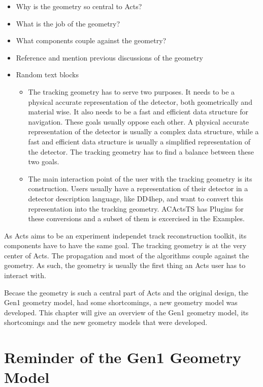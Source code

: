 \begin{itemize}
    \color{red}
    \item Why is the geometry so central to Acts?
    \item What is the job of the geometry?
    \item What components couple against the geometry?
    \item Reference and mention previous discussions of the geometry
    \item Random text blocks
    \begin{itemize}
        \item The tracking geometry has to serve two purposes. It needs to be a physical accurate representation of the detector, both geometrically and material wise. It also needs to be a fast and efficient data structure for navigation. These goals usually oppose each other. A physical accurate representation of the detector is usually a complex data structure, while a fast and efficient data structure is usually a simplified representation of the detector. The tracking geometry has to find a balance between these two goals.
        \item The main interaction point of the user with the tracking geometry is its construction. Users usually have a representation of their detector in a detector description language, like DD4hep, and want to convert this representation into the tracking geometry. ACActsTS has Plugins for these conversions and a subset of them is excercised in the Examples.
    \end{itemize}
\end{itemize}

As Acts aims to be an experiment independet track reconstruction toolkit, its components have to have the same goal. The tracking geometry is at the very center of Acts. The propagation and most of the algorithms couple against the geometry. As such, the geometry is usually the first thing an Acts user has to interact with.

Becase the geometry is such a central part of Acts and the original design, the Gen1 geometry model, had some shortcomings, a new geometry model was developed. This chapter will give an overview of the Gen1 geometry model, its shortcomings and the new geometry models that were developed.

\section{Reminder of the Gen1 Geometry Model}

